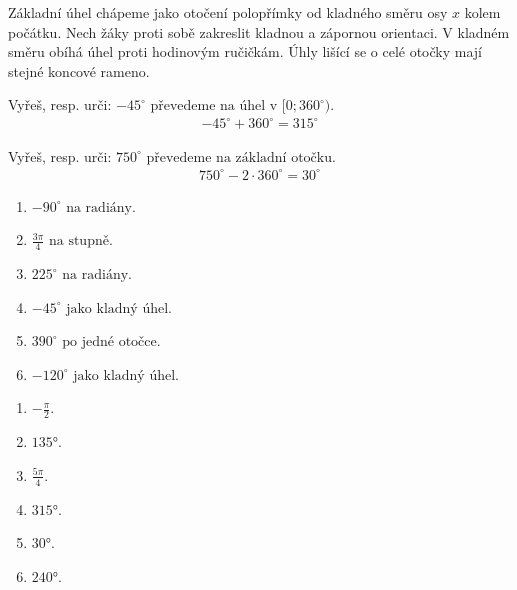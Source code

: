 \documentclass[11pt,a4paper]{article}
\begin{document}
Základní úhel chápeme jako otočení polopřímky od kladného směru osy $x$ kolem počátku. Nech žáky proti sobě zakreslit kladnou a zápornou orientaci.
V kladném směru obíhá úhel proti hodinovým ručičkám. Úhly lišící se o celé otočky mají stejné koncové rameno.
\begin{center}
\end{center}
\begin{prikladReseniBox}[title={Příklad 1}]
Vyřeš, resp. urči: $-45^\circ\text{ převedeme na úhel v }[0;360^\circ)$.
\tcblower
\[\begin{aligned}-45^\circ+360^\circ=315^\circ\end{aligned}\]
\end{prikladReseniBox}
\begin{prikladReseniBox}[title={Příklad 2}]
Vyřeš, resp. urči: $750^\circ\text{ převedeme na základní otočku}$.
\tcblower
\[\begin{aligned}750^\circ-2\cdot360^\circ=30^\circ\end{aligned}\]
\end{prikladReseniBox}
\begin{zadaniReseniBox}[title={Samostatná práce 1}]
\begin{enumerate}[label=\alph*)]
\item $-90^\circ\text{ na radiány}$.
\item $\frac{3\pi}{4}\text{ na stupně}$.
\item $225^\circ\text{ na radiány}$.
\item $-45^\circ\text{ jako kladný úhel}$.
\item $390^\circ\text{ po jedné otočce}$.
\item $-120^\circ\text{ jako kladný úhel}$.
\end{enumerate}
\tcblower
\begin{enumerate}[label=\alph*)]
\item $-\frac{\pi}{2}$.
\item $135°$.
\item $\frac{5\pi}{4}$.
\item $315°$.
\item $30°$.
\item $240°$.
\end{enumerate}
\end{zadaniReseniBox}
\end{document}

